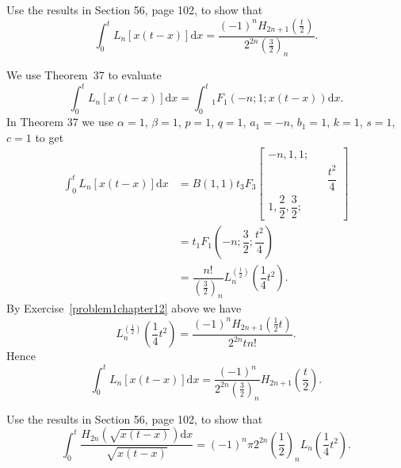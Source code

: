 \begin{problem}\label{problem4chapter12}
Use the results in Section 56, page 102, to show that
$$\displaystyle\int_0^t L_n[x(t-x)] \mathrm{d}x = \dfrac{(-1)^n H_{2n+1}(\frac{t}{2})}{2^{2n} (\frac{3}{2})_n}.$$
\end{problem}
\begin{solution}
We use Theorem~37 to evaluate
$$\displaystyle\int_0^t L_n[x(t-x)] \mathrm{d}x = \displaystyle\int_0^t {}_1F_1(-n;1;x(t-x))\mathrm{d}x.$$
In Theorem 37 we use $\alpha=1$, $\beta=1$, $p=1$, $q=1$, $a_1=-n$, $b_1=1$, $k=1$, $s=1$, $c=1$ to get
$$\begin{array}{ll}
\displaystyle\int_0^t L_n[x(t-x)] \mathrm{d}x &= B(1,1) t {}_3F_3 \left[ \begin{array}{rlr}
-n, 1 , 1; & & \\
& & \dfrac{t^2}{4} \\
1, \dfrac{2}{2}, \dfrac{3}{2}; & & 
\end{array} \right] \\
&= t {}_1F_1 \left(-n; \dfrac{3}{2}; \dfrac{t^2}{4} \right) \\
&= \dfrac{n!}{(\frac{3}{2})_n} L_n^{(\frac{1}{2})} \left( \dfrac{1}{4} t^2 \right).
\end{array}$$
By Exercise~\ref{problem1chapter12} above we have
$$L_n^{(\frac{1}{2})} \left( \dfrac{1}{4} t^2 \right) = \dfrac{(-1)^n H_{2n+1}(\frac{1}{2} t)}{2^{2n} t n!}.$$
Hence
$$\displaystyle\int_0^t L_n[x(t-x)] \mathrm{d}x = \dfrac{(-1)^n}{2^{2n} (\frac{3}{2})_n} H_{2n+1} \left( \dfrac{t}{2} \right).$$
\end{solution}
\begin{problem}\label{problem5chapter12}
Use the results in Section 56, page 102, to show that
$$\displaystyle\int_0^t \dfrac{H_{2n} (\sqrt{x(t-x)})\mathrm{d}x}{\sqrt{x(t-x)}} = (-1)^n \pi 2^{2n} \left( \dfrac{1}{2} \right)_n L_n \left( \dfrac{1}{4} t^2 \right).$$
\end{problem}

